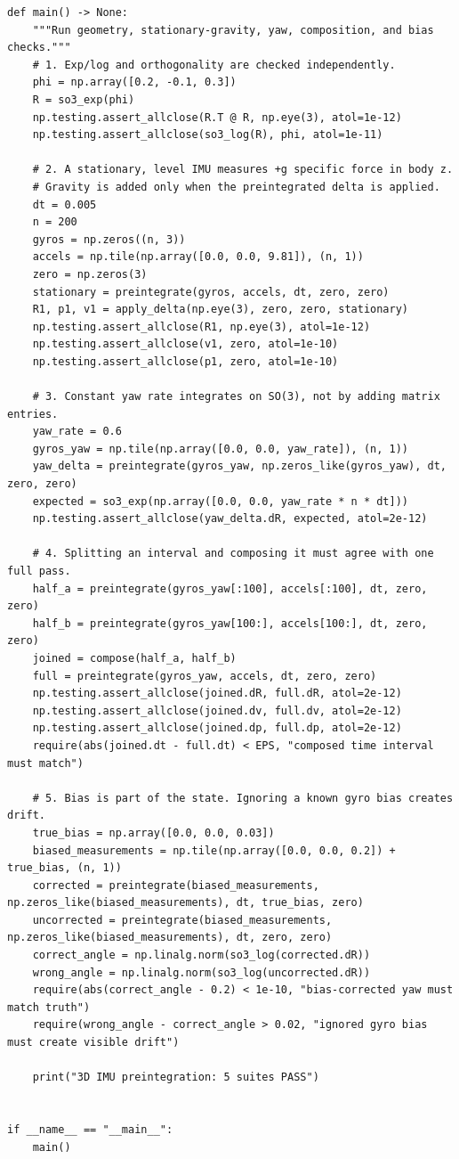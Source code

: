 \begin{verbatim}
def main() -> None:
    """Run geometry, stationary-gravity, yaw, composition, and bias checks."""
    # 1. Exp/log and orthogonality are checked independently.
    phi = np.array([0.2, -0.1, 0.3])
    R = so3_exp(phi)
    np.testing.assert_allclose(R.T @ R, np.eye(3), atol=1e-12)
    np.testing.assert_allclose(so3_log(R), phi, atol=1e-11)

    # 2. A stationary, level IMU measures +g specific force in body z.
    # Gravity is added only when the preintegrated delta is applied.
    dt = 0.005
    n = 200
    gyros = np.zeros((n, 3))
    accels = np.tile(np.array([0.0, 0.0, 9.81]), (n, 1))
    zero = np.zeros(3)
    stationary = preintegrate(gyros, accels, dt, zero, zero)
    R1, p1, v1 = apply_delta(np.eye(3), zero, zero, stationary)
    np.testing.assert_allclose(R1, np.eye(3), atol=1e-12)
    np.testing.assert_allclose(v1, zero, atol=1e-10)
    np.testing.assert_allclose(p1, zero, atol=1e-10)

    # 3. Constant yaw rate integrates on SO(3), not by adding matrix entries.
    yaw_rate = 0.6
    gyros_yaw = np.tile(np.array([0.0, 0.0, yaw_rate]), (n, 1))
    yaw_delta = preintegrate(gyros_yaw, np.zeros_like(gyros_yaw), dt, zero, zero)
    expected = so3_exp(np.array([0.0, 0.0, yaw_rate * n * dt]))
    np.testing.assert_allclose(yaw_delta.dR, expected, atol=2e-12)

    # 4. Splitting an interval and composing it must agree with one full pass.
    half_a = preintegrate(gyros_yaw[:100], accels[:100], dt, zero, zero)
    half_b = preintegrate(gyros_yaw[100:], accels[100:], dt, zero, zero)
    joined = compose(half_a, half_b)
    full = preintegrate(gyros_yaw, accels, dt, zero, zero)
    np.testing.assert_allclose(joined.dR, full.dR, atol=2e-12)
    np.testing.assert_allclose(joined.dv, full.dv, atol=2e-12)
    np.testing.assert_allclose(joined.dp, full.dp, atol=2e-12)
    require(abs(joined.dt - full.dt) < EPS, "composed time interval must match")

    # 5. Bias is part of the state. Ignoring a known gyro bias creates drift.
    true_bias = np.array([0.0, 0.0, 0.03])
    biased_measurements = np.tile(np.array([0.0, 0.0, 0.2]) + true_bias, (n, 1))
    corrected = preintegrate(biased_measurements, np.zeros_like(biased_measurements), dt, true_bias, zero)
    uncorrected = preintegrate(biased_measurements, np.zeros_like(biased_measurements), dt, zero, zero)
    correct_angle = np.linalg.norm(so3_log(corrected.dR))
    wrong_angle = np.linalg.norm(so3_log(uncorrected.dR))
    require(abs(correct_angle - 0.2) < 1e-10, "bias-corrected yaw must match truth")
    require(wrong_angle - correct_angle > 0.02, "ignored gyro bias must create visible drift")

    print("3D IMU preintegration: 5 suites PASS")


if __name__ == "__main__":
    main()
\end{verbatim}


